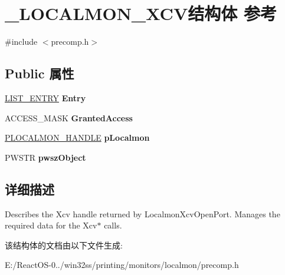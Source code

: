 \hypertarget{struct___l_o_c_a_l_m_o_n___x_c_v}{}\section{\+\_\+\+L\+O\+C\+A\+L\+M\+O\+N\+\_\+\+X\+C\+V结构体 参考}
\label{struct___l_o_c_a_l_m_o_n___x_c_v}


{\ttfamily \#include $<$precomp.\+h$>$}

\subsection*{Public 属性}
\begin{DoxyCompactItemize}
\item 
\mbox{\label{struct___l_o_c_a_l_m_o_n___x_c_v_ac0e8cb2b1931e66bb1644f83c85014c6}} 
\hyperlink{struct___l_i_s_t___e_n_t_r_y}{L\+I\+S\+T\+\_\+\+E\+N\+T\+RY} {\bfseries Entry}
\item 
\mbox{\label{struct___l_o_c_a_l_m_o_n___x_c_v_ae18a13ee9279a027bc9b6f0cf83457cd}} 
A\+C\+C\+E\+S\+S\+\_\+\+M\+A\+SK {\bfseries Granted\+Access}
\item 
\mbox{\label{struct___l_o_c_a_l_m_o_n___x_c_v_a984e5f10bb755485d1c748b7f815d5bd}} 
\hyperlink{struct___l_o_c_a_l_m_o_n___h_a_n_d_l_e}{P\+L\+O\+C\+A\+L\+M\+O\+N\+\_\+\+H\+A\+N\+D\+LE} {\bfseries p\+Localmon}
\item 
\mbox{\label{struct___l_o_c_a_l_m_o_n___x_c_v_aa209234cfaa64d997663be9ab0f0aec0}} 
P\+W\+S\+TR {\bfseries pwsz\+Object}
\end{DoxyCompactItemize}


\subsection{详细描述}
Describes the Xcv handle returned by Localmon\+Xcv\+Open\+Port. Manages the required data for the Xcv$\ast$ calls. 

该结构体的文档由以下文件生成\+:\begin{DoxyCompactItemize}
\item 
E\+:/\+React\+O\+S-\/0../win32ss/printing/monitors/localmon/precomp.\+h\end{DoxyCompactItemize}
